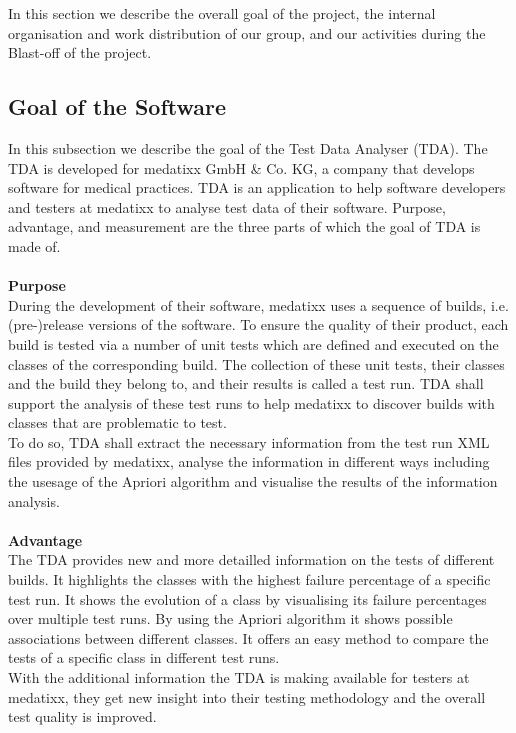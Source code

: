 In this section we describe the overall goal of the project, the internal organisation and work distribution of our group, and our activities during the Blast-off of the project.  \\

\subsection{Goal of the Software}

In this subsection we describe the goal of the Test Data Analyser (TDA). The TDA is developed for medatixx GmbH \& Co. KG, a company that develops software for medical practices. TDA is an application to help software developers and testers at medatixx to analyse test data of their software. Purpose, advantage, and measurement are the three parts of which the goal of TDA is made of. \\
\ \\
\large\textbf{Purpose}\\ 
During the development of their software, medatixx uses a sequence of builds, i.e. (pre-)release versions of the software. To ensure the quality of their product, each build is tested via a number of unit tests which are defined and executed on the classes of the corresponding build. The collection of these unit tests, their classes and the build they belong to, and their results is called a test run. TDA shall support the analysis of these test runs to help medatixx to discover builds with classes that are problematic to test. \\ 
To do so, TDA shall extract the necessary information from the test run XML files provided by medatixx, analyse the information in different ways including the usesage of the Apriori algorithm and visualise the results of the information analysis. \\ 
\ \\

\large\textbf{Advantage}\\ 
The TDA provides new and more detailled information on the tests of different builds. It highlights the classes with the highest failure percentage of a specific test run. It shows the evolution of a class by visualising its failure percentages over multiple test runs. By using the Apriori algorithm it shows possible associations between different classes. It offers an easy method to compare the tests of a specific class in different test runs. \\ 
With the additional information the TDA is making available for testers at medatixx, they get new insight into their testing methodology and the overall test quality is improved. \\
\ \\

